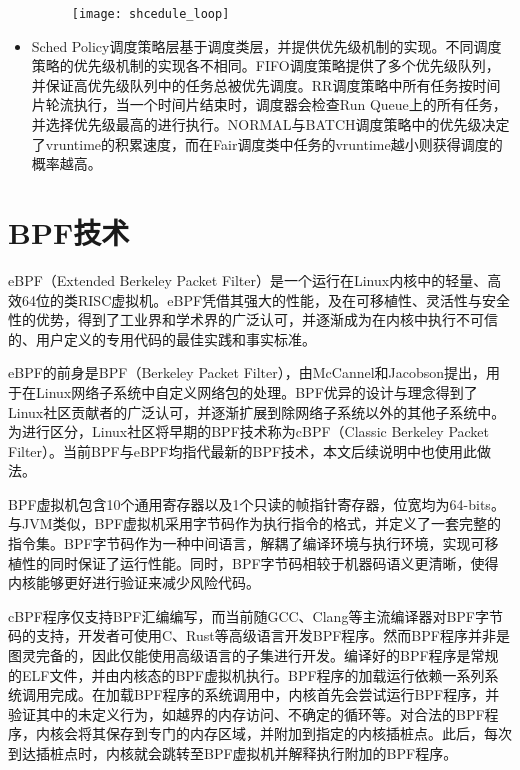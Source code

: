 \begin{itemize}
\begin{figure}[!htbp]
    \centering 
    \texttt{[image: shcedule\_loop]}
    \label{fig:shcedule_loop}
\end{figure}

    \item Sched Policy调度策略层基于调度类层，并提供优先级机制的实现。不同调度策略的优先级机制的实现各不相同。FIFO调度策略提供了多个优先级队列，并保证高优先级队列中的任务总被优先调度。RR调度策略中所有任务按时间片轮流执行，当一个时间片结束时，调度器会检查Run Queue上的所有任务，并选择优先级最高的进行执行。NORMAL与BATCH调度策略中的优先级决定了vruntime的积累速度，而在Fair调度类中任务的vruntime越小则获得调度的概率越高。

\end{itemize}

\section{BPF技术}


eBPF（Extended Berkeley Packet Filter）是一个运行在Linux内核中的轻量、高效64位的类RISC虚拟机\citep{sharaf2022extended}。eBPF凭借其强大的性能，及在可移植性、灵活性与安全性的优势，得到了工业界和学术界的广泛认可，并逐渐成为在内核中执行不可信的、用户定义的专用代码的最佳实践和事实标准。

eBPF的前身是BPF（Berkeley Packet Filter），由McCannel和Jacobson提出\citep{mccanne1993bsd}，用于在Linux网络子系统中自定义网络包的处理。BPF优异的设计与理念得到了Linux社区贡献者的广泛认可，并逐渐扩展到除网络子系统以外的其他子系统中。为进行区分，Linux社区将早期的BPF技术称为cBPF（Classic Berkeley Packet Filter）。当前BPF与eBPF均指代最新的BPF技术，本文后续说明中也使用此做法。

BPF虚拟机包含10个通用寄存器以及1个只读的帧指针寄存器，位宽均为64-bits。与JVM类似，BPF虚拟机采用字节码作为执行指令的格式，并定义了一套完整的指令集。BPF字节码作为一种中间语言，解耦了编译环境与执行环境，实现可移植性的同时保证了运行性能。同时，BPF字节码相较于机器码语义更清晰，使得内核能够更好进行验证来减少风险代码。

cBPF程序仅支持BPF汇编编写，而当前随GCC、Clang等主流编译器对BPF字节码的支持，开发者可使用C、Rust等高级语言开发BPF程序\citep{ebpfguidence}。然而BPF程序并非是图灵完备的，因此仅能使用高级语言的子集进行开发。编译好的BPF程序是常规的ELF文件，并由内核态的BPF虚拟机执行。BPF程序的加载运行依赖一系列系统调用完成。在加载BPF程序的系统调用中，内核首先会尝试运行BPF程序，并验证其中的未定义行为，如越界的内存访问、不确定的循环等。对合法的BPF程序，内核会将其保存到专门的内存区域，并附加到指定的内核插桩点。此后，每次到达插桩点时，内核就会跳转至BPF虚拟机并解释执行附加的BPF程序。

